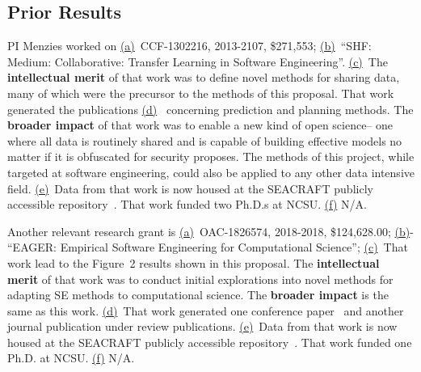 \documentclass{NSF}
\newcommand{\tbl}[1]{Table~\ref{tbl:#1}}
\begin{document}
\begin{nsfdescription}
 
\section{Prior Results}\label{sec:PriorResults}


 PI Menzies worked on \underline{(a)}~CCF-1302216, 2013-2107, \$271,553;   \underline{(b)}~``SHF: Medium: Collaborative: Transfer Learning in Software Engineering''. 
\underline{(c)}~The {\bf intellectual merit} of that work was to
define novel methods for sharing data, many of which were the precursor to the methods of this proposal.  That work generated the publications  \underline{(d)}~\cite{krishna2018bellwethers,PetersML15,krishna16,he13,Me17,fu2016tuning,krishna2017learning} concerning prediction and planning methods.
The {\bf broader impact} of that work was to
enable a new kind of open science-- one where all data is routinely shared and is capable of building effective models no matter if it is obfuscated for security proposes.
The methods of this project, while targeted at software engineering, could also be applied to any other data intensive field.   
 \underline{(e)}~Data from that work is now housed at the SEACRAFT publicly accessible repository~\cite{seacraft}. That work  funded two Ph.D.s at NCSU. \underline{(f)}
N/A.  

Another relevant research grant is 
\underline{(a)}~OAC-1826574, 2018-2018, 
\$124,628.00;
\underline{(b)}-
``EAGER: Empirical Software Engineering for Computational Science'';
\underline{(c)}~That work lead to the Figure~2 results
shown in this proposal.
The {\bf intellectual merit} of that work was to
conduct initial explorations into novel methods for adapting SE methods to computational science.
The {\bf broader impact} is the same as this work.
\underline{(d)}~That work generated one conference paper~\cite{abs-1807-11112}
and another journal publication under review publications.
 \underline{(e)}~Data from that work is now housed at the SEACRAFT publicly accessible repository~\cite{seacraft}. That work  funded one Ph.D. at NCSU. 
 \underline{(f)} N/A.  




% 
%
%

 


\end{nsfdescription}
\end{document}

